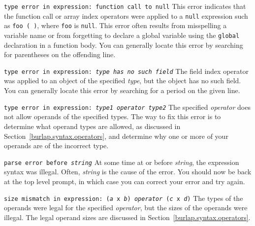 \begin{dispitems}

\item[\tt type error in expression: function call to null]
This error indicates that the function call or array index operators
were applied to a {\tt null} expression such as {\tt foo ( )}, where
{\tt foo} is {\tt null}.  This error often results from misspelling a
variable name or from forgetting to declare a global variable using
the {\tt global} declaration in a function body.  You can generally
locate this error by searching for parentheses on the offending line.

\item[\tt type error in expression: \it type \tt has no such field]
The field index operator was applied to an object of the specified
{\it type}, but the object has no such field.  You can generally
locate this error by searching for a period on the given line.

\item[\tt type error in expression: \it type1 operator type2]
The specified {\it operator} does not allow operands of the specified
types.  The way to fix this error is to determine what operand types
are allowed, as discussed in Section~\ref{burlap.syntax.operators},
and determine why one or more of your operands are of the incorrect
type.

\item[\tt parse error before \it string]
At some time at or before {\it string}, the expression syntax was
illegal.  Often, {\it string} is the cause of the error.  You should
now be back at the top level prompt, in which case you can correct
your error and try again.

\item[\tt size mismatch in expression: ({\it a} x {\it b}) {\it operator}
({\it c} x {\it d})]
The types of the operands were legal for the specified {\it operator},
but the sizes of the operands were illegal.  The legal operand sizes
are discussed in Section~\ref{burlap.syntax.operators}.

\end{dispitems}
